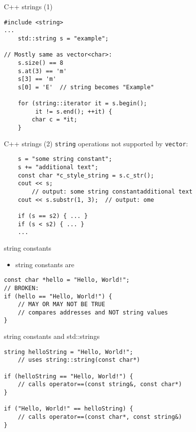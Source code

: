 \begin{frame}[fragile,label=cppStr]{C++ strings (1)}
\lstset{
    language=C++,
    style=small
}
\begin{lstlisting}
#include <string>
...
    std::string s = "example";

// Mostly same as vector<char>:
    s.size() == 8
    s.at(3) == 'm'
    s[3] == 'm'
    s[0] = 'E'  // string becomes "Example"

    for (string::iterator it = s.begin();
         it != s.end(); ++it) {
        char c = *it;
    }
\end{lstlisting}
\end{frame}

\begin{frame}[fragile,label=cppStrAddtl]{C++ strings (2)}
\lstset{
    language=C++,
    style=small
}
\texttt{string} operations not supported by {\tt vector}:
\begin{lstlisting}
    s = "some string constant";
    s += "additional text";
    const char *c_style_string = s.c_str();
    cout << s;
        // output: some string constantadditional text
    cout << s.substr(1, 3);  // output: ome

    if (s == s2) { ... }
    if (s < s2) { ... }
    ...
\end{lstlisting}
\end{frame}

\begin{frame}[fragile,label=strConstants]{string constants}
\lstset{
    language=C++,
    style=small
}
    \begin{itemize}
        \item string constants are 
    \end{itemize}
\begin{lstlisting}
const char *hello = "Hello, World!";
// BROKEN:
if (hello == "Hello, World!") {
    // MAY OR MAY NOT BE TRUE
    // compares addresses and NOT string values
}
\end{lstlisting}
\end{frame}

\begin{frame}[fragile,label=strConstAndStdStr]{string constants and std::strings}
\lstset{
    language=C++,
    style=small
}
\begin{lstlisting}
string helloString = "Hello, World!";
    // uses string::string(const char*)

if (helloString == "Hello, World!") {
    // calls operator==(const string&, const char*)
}

if ("Hello, World!" == helloString) {
    // calls operator==(const char*, const string&)
}
\end{lstlisting}
\end{frame}
